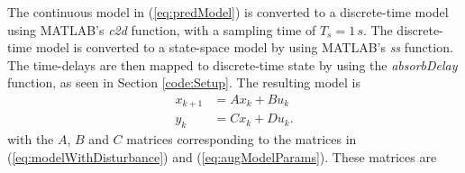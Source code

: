 \documentclass[12pt]{article}
\begin{document}
The continuous model in (\ref{eq:predModel}) is converted to a discrete-time model using MATLAB's \textit{c2d} function, with a sampling time of $T_s = 1 \,s$. The discrete-time model is converted to a state-space model by using MATLAB's \textit{ss} function. The time-delays are then mapped to discrete-time state by using the \textit{absorbDelay} function, as seen in Section \ref{code:Setup}. The resulting model is
\begin{subequations}
\begin{align}
x_{k+1} &= Ax_k + Bu_k \\
y_k &= Cx_k + Du_k.
\end{align} \label{eq:PredModel}
\end{subequations}
with the $A$, $B$ and $C$ matrices corresponding to the matrices in (\ref{eq:modelWithDisturbance}) and (\ref{eq:augModelParams}). These matrices are
\end{document}
